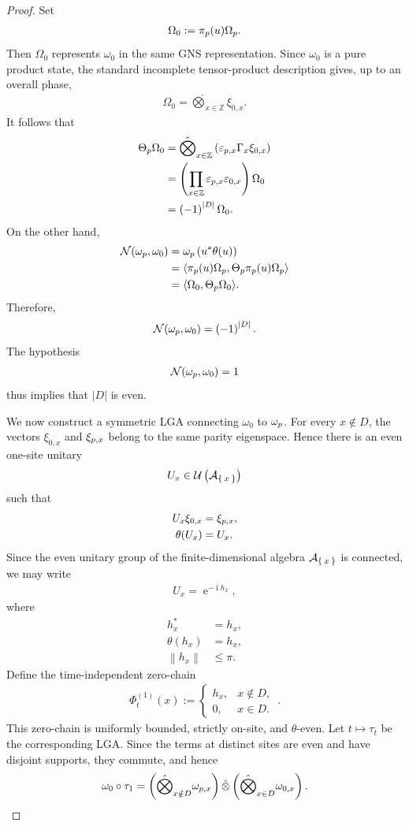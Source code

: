 \documentclass[10pt,a4paper]{amsart}
\newcommand{\ZZ}{\mathbb{Z}}
\newcommand{\br}[1]{\left(#1\right)}
\newcommand{\calA}{\mathcal{A}}
\newcommand{\calN}{\mathcal{N}}
\newcommand{\calU}{\mathcal{U}}
\newcommand{\ee}{\operatorname{e}}
\newcommand{\eq}[1]{\begin{align*}#1\end{align*}}
\newcommand{\eql}[1]{\begin{align}#1\end{align}}
\newcommand{\ii}{\operatorname{i}}
\newcommand{\ip}[2]{\langle #1, #2 \rangle}
\newcommand\norm[1]{\left\lVert#1\right\rVert}
\newcommand{\ve}{\varepsilon}
\begin{document}
\begin{proof}
Set
\eq{
\Omega_0
:=
\pi_{\rm p}(u)\Omega_{\rm p}.
}
Then $\Omega_0$ represents $\omega_0$ in the same GNS representation.
Since $\omega_0$ is a pure product state, the standard incomplete
tensor-product description gives, up to an overall phase,
\eq{
\Omega_0
=
\hat{\bigotimes}_{x\in\ZZ}
\xi_{0,x}.
}
It follows that
\eq{
\Theta_{\rm p}\Omega_0
&=
\hat{\bigotimes}_{x\in\ZZ}
\br{
\ve_{{\rm p},x}\Gamma_x\xi_{0,x}
}\\
&=
\br{
\prod_{x\in\ZZ}
\ve_{{\rm p},x}\ve_{0,x}
}
\Omega_0\\
&=
\br{
-1
}^{\lvert D\rvert}
\Omega_0.
}
On the other hand,
\eq{
\calN(\omega_{\rm p},\omega_0)
&=
\omega_{\rm p}
\br{
u^\ast\theta(u)
}\\
&=
\ip{
\pi_{\rm p}(u)\Omega_{\rm p}
}{
\Theta_{\rm p}\pi_{\rm p}(u)\Omega_{\rm p}
}\\
&=
\ip{
\Omega_0
}{
\Theta_{\rm p}\Omega_0
}.
}
Therefore,
\eql{
\calN(\omega_{\rm p},\omega_0)
=
\br{
-1
}^{\lvert D\rvert}.
}
The hypothesis
\eq{
\calN(\omega_{\rm p},\omega_0)
=
1
}
thus implies that $\lvert D\rvert$ is even.

We now construct a symmetric LGA connecting $\omega_0$ to
$\omega_{\rm p}$. For every $x\notin D$, the vectors $\xi_{0,x}$ and
$\xi_{{\rm p},x}$ belong to the same parity eigenspace. Hence there is
an even one-site unitary
\eq{
U_x
\in
\calU\br{
\calA_{\Set{x}}
}
}
such that
\eq{
U_x\xi_{0,x}
&=
\xi_{{\rm p},x},\\
\theta(U_x)
&=
U_x.
}
Since the even unitary group of the finite-dimensional algebra
$\calA_{\Set{x}}$ is connected, we may write
\eq{
U_x
=
\ee^{-\ii h_x},
}
where
\eq{
h_x^\ast
&=
h_x,\\
\theta(h_x)
&=
h_x,\\
\norm{h_x}
&\leq
\pi.
}
Define the time-independent zero-chain
\eq{
\Phi^{(1)}_t(x)
:=
\begin{cases}
h_x,
&
x\notin D,\\
0,
&
x\in D.
\end{cases}\,.
}
This zero-chain is uniformly bounded, strictly on-site, and
$\theta$-even. Let $t\mapsto\tau_t$ be the corresponding LGA. Since the
terms at distinct sites are even and have disjoint supports, they
commute, and hence
\eq{
\omega_0\circ\tau_1
=
\br{
\hat{\bigotimes}_{x\notin D}
\omega_{{\rm p},x}
}
\hat{\otimes}
\br{
\hat{\bigotimes}_{x\in D}
\omega_{0,x}
}.
}


\end{proof}
\end{document}
